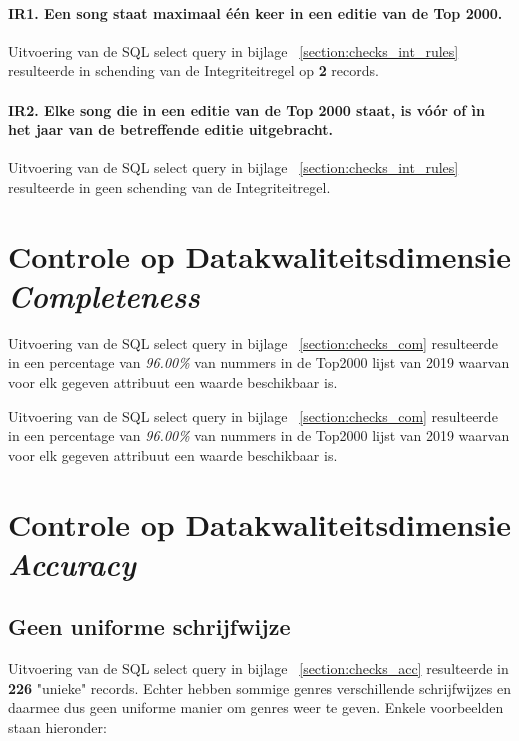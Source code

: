 \documentclass{report}
\begin{document}
            \paragraph{IR1. Een song staat maximaal één keer in een editie van de Top 2000.}
                Uitvoering van de SQL select query in bijlage ~\ref{section:checks_int_rules} 
                resulteerde in schending van de Integriteitregel op \textbf{2} records.

            \paragraph{IR2. Elke song die in een editie van de Top 2000 staat, 
            is vóór of ìn het jaar van de betreffende editie uitgebracht.}
                Uitvoering van de SQL select query in bijlage ~\ref{section:checks_int_rules} 
                resulteerde in geen schending van de Integriteitregel.


        \section{Controle op Datakwaliteitsdimensie \textit{Completeness}}

            Uitvoering van de SQL select query in bijlage ~\ref{section:checks_com} 
            resulteerde in een percentage van \textit{96.00\%} 
            van nummers in de Top2000 lijst van 2019 waarvan voor elk gegeven attribuut een waarde beschikbaar is.

            Uitvoering van de SQL select query in bijlage ~\ref{section:checks_com} 
            resulteerde in een percentage van \textit{96.00\%} 
            van nummers in de Top2000 lijst van 2019 waarvan voor elk gegeven attribuut een waarde beschikbaar is.


        \section{Controle op Datakwaliteitsdimensie \textit{Accuracy}}


            \subsection{Geen uniforme schrijfwijze}
                Uitvoering van de SQL select query in bijlage ~\ref{section:checks_acc} 
                resulteerde in \textbf{226} "unieke" records.
                Echter hebben sommige genres verschillende schrijfwijzes en daarmee dus geen uniforme manier om genres weer te geven.
                Enkele voorbeelden staan hieronder:
\end{document}
